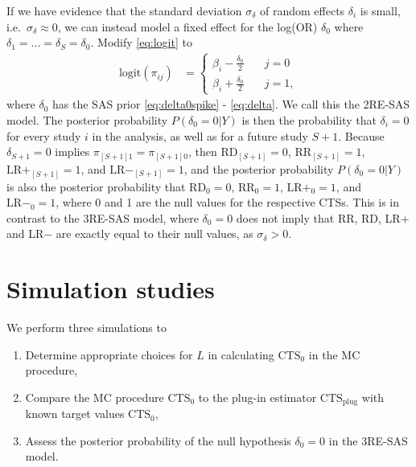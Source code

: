 \documentclass[AMA,STIX1COL]{WileyNJD-v2}
\newcommand{\CTSo}{\text{CTS}_0}
\newcommand{\CTSp}{\text{CTS}_{\text{plug}}}
\begin{document}
If we have evidence that the standard deviation $\sigma_{\delta}$ of random effects $\delta_i$ is small, i.e.\ $\sigma_{\delta} \approx 0$, we can instead model a fixed effect for the log(OR) $\delta_0$ where $\delta_1 = \dots = \delta_S = \delta_0$. Modify \eqref{eq:logit} to 
\begin{align}
\mbox{logit}(\pi_{ij}) & =  \left\{
                  \begin{array}{ll}
                    \beta_{i} - \frac{\delta_0}{2} & \quad j=0 \\ 
                    \beta_{i} + \frac{\delta_0}{2} & \quad j=1,
                  \end{array}
                \right. \label{eq:fixed_logit}
\end{align}
where $\delta_0$ has the SAS prior \eqref{eq:delta0spike} - \eqref{eq:delta}. We call this the 2RE-SAS model. The posterior probability $P(\delta_0 = 0 \vert Y)$ is then the probability that $\delta_i = 0$ for every study $i$ in the analysis, as well as for a future study $S + 1$. Because $\delta_{S+1} = 0$ implies $\pi_{[S+1]1} = \pi_{[S+1]0}$, then $\text{RD}_{[S+1]} = 0$, $\text{RR}_{[S+1]} = 1$, $\text{LR}+_{[S+1]} = 1$, and $\text{LR}-_{[S+1]} = 1$, and the posterior probability $P(\delta_0 = 0 \vert Y)$ is also the posterior probability that $\text{RD}_0 = 0$, $\text{RR}_0 = 1$, $\text{LR}+_0 = 1$, and $\text{LR}-_0 = 1$, where 0 and 1 are the null values for the respective CTSs. This is in contrast to the 3RE-SAS model, where $\delta_0 = 0$ does not imply that RR, RD, LR$+$ and LR$-$ are exactly equal to their null values, as $\sigma_{\delta} > 0$.

\section{Simulation studies} \label{sec:simulation}

We perform three simulations to 
\begin{enumerate}
\item{Determine appropriate choices for $L$ in calculating $\CTSo$ in the MC procedure,}
\item{Compare the MC procedure $\CTSo$ to the plug-in estimator $\CTSp$ with known target values $\CTSo$,}
\item{Assess the posterior probability of the null hypothesis $\delta_0 = 0$ in the 3RE-SAS model.}
\end{enumerate}
\end{document}

